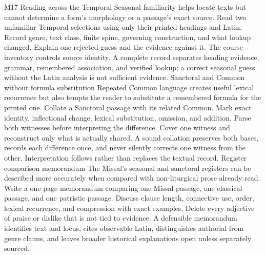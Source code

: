 \begin{courseunit}{M17}
\SubmoduleExtension
  {Reading across the Temporal}
  {Seasonal familiarity helps locate texts but cannot determine a form's
  morphology or a passage's exact source.}
  {Read two unfamiliar Temporal selections using only their printed headings
  and Latin.  Record genre, text class, finite spine, governing construction,
  and what lookup changed.}
  {Explain one rejected guess and the evidence against it.}
  {The course inventory controls source identity.  A complete record separates
  heading evidence, grammar, remembered association, and verified lookup; a
  correct seasonal guess without the Latin analysis is not sufficient evidence.}
\SubmoduleExtension
  {Sanctoral and Common without formula substitution}
  {Repeated Common language creates useful lexical recurrence but also tempts
  the reader to substitute a remembered formula for the printed one.}
  {Collate a Sanctoral passage with its related Common.  Mark exact identity,
  inflectional change, lexical substitution, omission, and addition.  Parse
  both witnesses before interpreting the difference.}
  {Cover one witness and reconstruct only what is actually shared.}
  {A sound collation preserves both bases, records each difference once, and
  never silently corrects one witness from the other.  Interpretation follows
  rather than replaces the textual record.}
\SubmoduleExtension
  {Register comparison memorandum}
  {The Missal's seasonal and sanctoral registers can be described more
  accurately when compared with non-liturgical prose already read.}
  {Write a one-page memorandum comparing one Missal passage, one classical
  passage, and one patristic passage.  Discuss clause length, connective use,
  order, lexical recurrence, and compression with exact examples.}
  {Delete every adjective of praise or dislike that is not tied to evidence.}
  {A defensible memorandum identifies text and locus, cites observable Latin,
  distinguishes authorial from genre claims, and leaves broader historical
  explanations open unless separately sourced.}
\end{courseunit}

